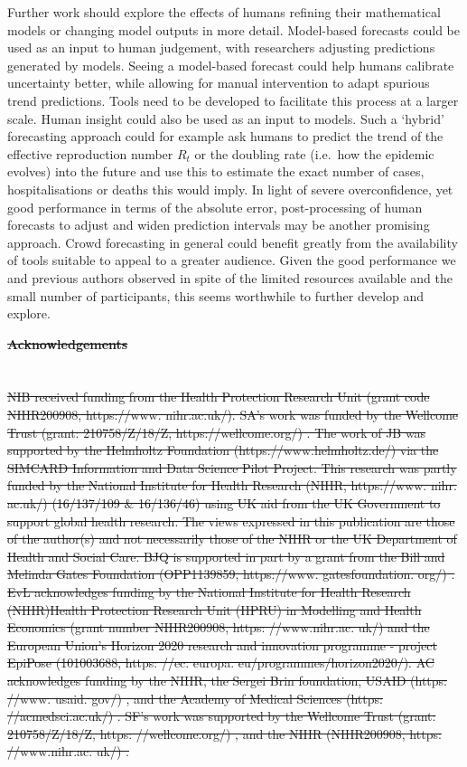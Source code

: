 \documentclass[10pt,letterpaper]{article}
\providecommand{\DIFaddtex}[1]{{\protect\color{blue}\uwave{#1}}} %
\providecommand{\DIFdeltex}[1]{{\protect\color{red}\sout{#1}}}                      %
\providecommand{\DIFaddbegin}{} %
\providecommand{\DIFaddend}{} %
\providecommand{\DIFdelbegin}{} %
\providecommand{\DIFdelend}{} %
\providecommand{\DIFadd}[1]{\texorpdfstring{\DIFaddtex{#1}}{#1}} %
\providecommand{\DIFdel}[1]{\texorpdfstring{\DIFdeltex{#1}}{}} %
\newcommand{\DIFscaledelfig}{0.5}
\newlength{\DIFdelgraphicswidth} %
\newlength{\DIFdelgraphicsheight} %
\newcommand{\DIFaddincludegraphics}[2][]{{\color{blue}\fbox{\DIFOincludegraphics[#1]{#2}}}} %
\newcommand{\DIFdelincludegraphics}[2][]{%
\sbox{\DIFdelgraphicsbox}{\DIFOincludegraphics[#1]{#2}}%
\settoboxwidth{\DIFdelgraphicswidth}{\DIFdelgraphicsbox} %
\settoboxtotalheight{\DIFdelgraphicsheight}{\DIFdelgraphicsbox} %
\scalebox{\DIFscaledelfig}{%
\parbox[b]{\DIFdelgraphicswidth}{\usebox{\DIFdelgraphicsbox}\\[-\baselineskip] \rule{\DIFdelgraphicswidth}{0em}}\llap{\resizebox{\DIFdelgraphicswidth}{\DIFdelgraphicsheight}{%
\setlength{\unitlength}{\DIFdelgraphicswidth}%
\begin{picture}(1,1)%
\thicklines\linethickness{2pt} %
{\color[rgb]{1,0,0}\put(0,0){\framebox(1,1){}}}%
{\color[rgb]{1,0,0}\put(0,0){\line( 1,1){1}}}%
{\color[rgb]{1,0,0}\put(0,1){\line(1,-1){1}}}%
\end{picture}%
}\hspace*{3pt}}} %
} %
\DeclareRobustCommand{\DIFaddbegin}{\DIFOaddbegin \let\includegraphics\DIFaddincludegraphics} %
\DeclareRobustCommand{\DIFaddend}{\DIFOaddend \let\includegraphics\DIFOincludegraphics} %
\DeclareRobustCommand{\DIFdelbegin}{\DIFOdelbegin \let\includegraphics\DIFdelincludegraphics} %
\DeclareRobustCommand{\DIFdelend}{\DIFOaddend \let\includegraphics\DIFOincludegraphics} %
\begin{document}
Further work should explore the effects of humans refining their
mathematical models or changing model outputs in more detail.
Model-based forecasts could be used as an input to human judgement, with
researchers adjusting predictions generated by models. Seeing a
model-based forecast could help humans calibrate uncertainty better,
while allowing for manual intervention to adapt spurious trend
predictions. Tools need to be developed to facilitate this process at a
larger scale. Human insight could also be used as an input to models.
Such a `hybrid' forecasting approach could for example ask humans to
predict the trend of the effective reproduction number \(R_t\) or the
doubling rate (i.e.~how the epidemic evolves) into the future and use
this to estimate the exact number of cases, hospitalisations or deaths
this would imply. In light of severe overconfidence, yet good
performance in terms of the absolute error, post-processing of human
forecasts to adjust and widen prediction intervals may be another
promising approach. Crowd forecasting in general could benefit greatly
from the availability of tools suitable to appeal to a greater audience.
Given the good performance we and previous authors observed in spite of
the limited resources available and the small number of participants,
this seems worthwhile to further develop and explore.

\clearpage

\DIFdelbegin \textbf{\DIFdel{Acknowledgements}}
\DIFdelend \DIFaddbegin \section*{\DIFadd{Acknowledgments}}
\DIFaddend 

\DIFdelbegin \DIFdel{NIB received funding from the Health Protection Research Unit (grant
code NIHR200908, https://www.
nihr.ac.uk/). SA's work was funded by the Wellcome Trust (grant: 210758/Z/18/Z, https://wellcome.org/) . The work
of JB was supported by the
Helmholtz Foundation
(https://www.helmholtz.de/) via the SIMCARD Information and Data Science
Pilot Project. This research was partly funded by the National Institute
for Health Research (NIHR, https://www. nihr. ac.uk/) (16/137/109 \&
16/136/46) using UK aid from the UK Government to support global health
research. The views expressed in this publication are those of the
author(s) and not necessarily those of the NIHR or the UK Department of Health and Social Care. BJQ is supported in part by a grant from the
Bill and Melinda Gates Foundation (OPP1139859,
https://www. gatesfoundation.
org/) . EvL acknowledges funding by the National Institute for Health Research (NIHR)Health Protection Research
Unit (HPRU) in Modelling and Health Economics (grant number NIHR200908, https: //www.nihr.ac. uk/) and the European Union's Horizon 2020 research
and innovation programme - project EpiPose (101003688, https: //ec. europa. eu/programmes/horizon2020/). AC acknowledges funding
by the NIHR, the Sergei Brin foundation, USAID (https: //www. usaid.
gov/) ,
and the Academy of Medical Sciences (https: //acmedsci.ac.uk/) . SF's work
was supported by the Wellcome Trust (grant: 210758/Z/18/Z, https: //wellcome.org/) , and the NIHR (NIHR200908,
https:
//www.nihr.ac. uk/) .
}%
\end{document}
